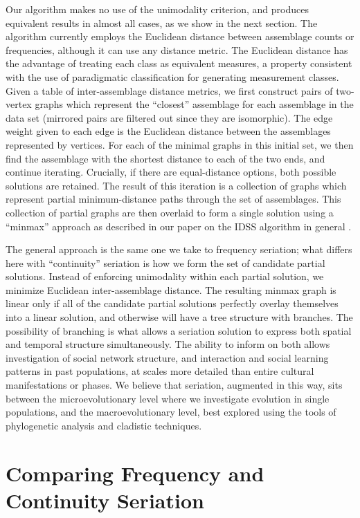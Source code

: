\documentclass[graybox,natbib]{svmult}
\begin{document}
Our algorithm makes no use of the unimodality criterion, and produces
equivalent results in almost all cases, as we show in the next section.
The algorithm currently employs the Euclidean distance between
assemblage counts or frequencies, although it can use any distance
metric. The Euclidean distance has the advantage of treating each class
as equivalent measures, a property consistent with the use of
paradigmatic classification \citep[sensu][]{Dunnell1971} for generating
measurement classes. Given a table of inter-assemblage distance metrics,
we first construct pairs of two-vertex graphs which represent the
``closest'' assemblage for each assemblage in the data set (mirrored
pairs are filtered out since they are isomorphic). The edge weight given
to each edge is the Euclidean distance between the assemblages
represented by vertices. For each of the minimal graphs in this initial
set, we then find the assemblage with the shortest distance to each of
the two ends, and continue iterating. Crucially, if there are
equal-distance options, both possible solutions are retained. The result
of this iteration is a collection of graphs which represent partial
minimum-distance paths through the set of assemblages. This collection
of partial graphs are then overlaid to form a single solution using a
``minmax'' approach as described in our paper on the IDSS algorithm in
general \citep{lipomadsendunnell2015}.

The general approach is the same one we take to frequency seriation;
what differs here with ``continuity'' seriation is how we form the set
of candidate partial solutions. Instead of enforcing unimodality within
each partial solution, we minimize Euclidean inter-assemblage distance.
The resulting minmax graph is linear only if all of the candidate
partial solutions perfectly overlay themselves into a linear solution,
and otherwise will have a tree structure with branches. The possibility
of branching is what allows a seriation solution to express both spatial
and temporal structure simultaneously. The ability to inform on both
allows investigation of social network structure, and interaction and
social learning patterns in past populations, at scales more detailed
than entire cultural manifestations or phases. We believe that
seriation, augmented in this way, sits between the microevolutionary
level where we investigate evolution in single populations, and the
macroevolutionary level, best explored using the tools of phylogenetic
analysis and cladistic techniques.

\section{Comparing Frequency and Continuity
Seriation}\label{comparing-frequency-and-continuity-seriation}
\end{document}
